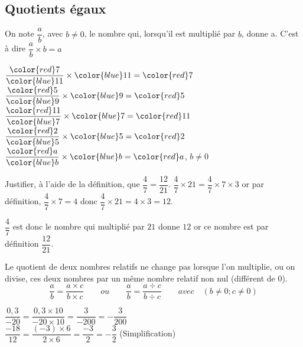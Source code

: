 \begin{changemargin}{0mm}{-15mm}
    \section{Quotients égaux}
    \begin{definition}
        On note $\dfrac{a}{b}$, avec $b\neq 0$, le nombre qui, lorsqu'il est multiplié par $b$, donne a.
        C'est à dire $\dfrac{a}{b} \times b=a$
    \end{definition}

    \begin{exemples*1}
        \phantom{rrr}

        \medskip
        $\dfrac{{\color{red}7}}{{\color{blue}11}} \times {\color{blue}11}={\color{red}7}$
        \hfill
        $\dfrac{{\color{red}5}}{{\color{blue}9}} \times {\color{blue}9}={\color{red}5}$
        \hfill
        $\dfrac{{\color{red}11}}{{\color{blue}7}} \times {\color{blue}7}={\color{red}11}$
        \hfill
        $\dfrac{{\color{red}2}}{{\color{blue}5}} \times {\color{blue}5}={\color{red}2}$
        \hfill
        $\dfrac{{\color{red}a}}{{\color{blue}b}} \times {\color{blue}b}={\color{red}a}$, $b\neq 0$
    \end{exemples*1}

    \begin{exemple*1}
        Justifier, à l'aide de la définition, que $\dfrac{4}{7}=\dfrac{12}{21}$.
        \correction
        $\dfrac{4}{7}\times 21=\dfrac{4}{7}\times 7\times 3$ or par définition, $\dfrac{4}{7}\times 7=4$ donc $\dfrac{4}{7}\times 21=4\times 3 = 12$.

        $\dfrac{4}{7}$ est donc le nombre qui multiplié par $21$ donne $12$ or ce nombre est par définition $\dfrac{12}{21}$.
    \end{exemple*1}

    \begin{propriete}[\admise]
        Le quotient de deux nombres relatifs ne change pas lorsque l'on multiplie, ou on divise, ces deux nombres par un même nombre
        relatif non nul (différent de 0).
        $$\frac{a}{b}=\frac{a\times c}{b\times c}\qquad ou \qquad \frac{a}{b}=\frac{a\div
        c}{b\div c}\qquad avec \quad  (b\not=0; c\not=0)$$
    \end{propriete}

    \begin{exemples*1}
        \phantom{rrr}
        \begin{multicols}{2}
        $\dfrac{0,3}{-20}=\dfrac{0,3\times10}{-20\times10}=\dfrac3{-200}=-\dfrac3{200}$\\    
        $\dfrac{-18}{12}=\dfrac{(-3)\times6}{2\times6}=\dfrac{-3}2=-\dfrac32$ (Simplification)
        \end{multicols}
    \end{exemples*1}


\end{changemargin}
